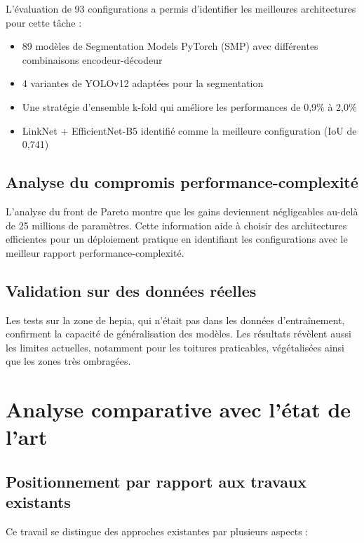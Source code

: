 L'évaluation de 93 configurations a permis d'identifier les meilleures architectures pour cette tâche :

\begin{itemize}
    \item 89 modèles de Segmentation Models PyTorch (SMP) avec différentes combinaisons encodeur-décodeur
    \item 4 variantes de YOLOv12 adaptées pour la segmentation
    \item Une stratégie d'ensemble k-fold qui améliore les performances de 0,9\% à 2,0\%
    \item LinkNet + EfficientNet-B5 identifié comme la meilleure configuration (IoU de 0,741)
\end{itemize}

\subsection{Analyse du compromis performance-complexité}

L'analyse du front de Pareto montre que les gains deviennent négligeables au-delà de 25 millions de paramètres. Cette information aide à choisir des architectures efficientes pour un déploiement pratique en identifiant les configurations avec le meilleur rapport performance-complexité.

\subsection{Validation sur des données réelles}

Les tests sur la zone de \acrshort{hepia}, qui n'était pas dans les données d'entraînement, confirment la capacité de généralisation des modèles. Les résultats révèlent aussi les limites actuelles, notamment pour les toitures praticables, végétalisées ainsi que les zones très ombragées.

\section{Analyse comparative avec l'état de l'art}

\subsection{Positionnement par rapport aux travaux existants}

Ce travail se distingue des approches existantes par plusieurs aspects :

